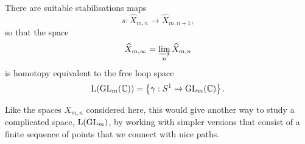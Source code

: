 \begin{conjecture}
  There are suitable stabilisations maps
  \[ s : \widehat{X}_{m,n} \to \widehat{X}_{m,n+1}, \]
  so that the space
  \[ \widehat{X}_{m,\infty} = \varinjlim_n \widehat{X}_{m,n} \]
  is homotopy equivalent to the free loop space
  \[ \mathrm{L}(\operatorname{GL}_m(\mathbb{C})) = \left\{  \gamma : S^1 \to \operatorname{GL}_m(\mathbb{C})  \right\}. \]
\end{conjecture}

Like the spaces $X_{m,n}$ considered here, this would give another way
to study a complicated space, $\mathrm{L}(\operatorname{GL}_m)$, by working with
simpler versions that consist of a finite sequence of points that we
connect with nice paths.

